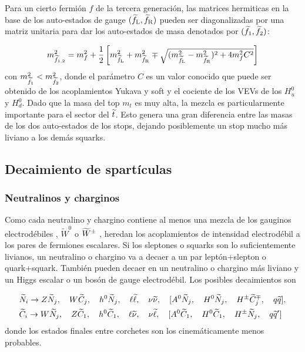 Para un cierto fermión $f$ de la tercera generación, las matrices hermiticas en
la base de los auto-estados de gauge $(\widetilde{f}_{\mathrm{L}}, \widetilde{f}_{\mathrm{R}})$ pueden ser
diagonalizadas por una matriz unitaria para dar los auto-estados de masa
denotados por $(\widetilde{f}_{\mathrm{1}}, \widetilde{f}_{\mathrm{2}})$:

\begin{equation}
  m_{\widetilde{f}_{\mathrm{1,2}}}^2 = m^2_f + \frac{1}{2} \left[
    m_{\widetilde{f}_{\mathrm{L}}}^2 + m_{\widetilde{f}_{\mathrm{R}}}^2 \mp \sqrt{(m_{\widetilde{f}_{\mathrm{L}}}^2 -
      m_{\widetilde{f}_{\mathrm{R}}}^2)^2 + 4 m_f^2 C^2} \right]
\end{equation}
%
con $m_{\widetilde{f}_{\mathrm{1}}}^2 < m_{\widetilde{f}_{\mathrm{2}}}^2$, donde el parámetro $C$ es un
valor conocido que puede ser obtenido de los acoplamientos Yukava y soft y el
cociente de los VEVs de los $H_u^0$ y $H_d^0$. Dado que la masa del top $m_t$ es
muy alta, la mezcla es particularmente importante para el sector del $\widetilde{t}$.
Esto genera una gran diferencia entre las masas de los dos auto-estados de los
stops, dejando posiblemente un stop mucho más liviano a los demás squarks.


\subsection{Decaimiento de spartículas}

\subsubsection{Neutralinos y charginos}

Como cada neutralino y chargino contiene al menos una mezcla de los gauginos
electrodébiles {\bino}, $\tilde W^0$ o $\widetilde{W}^{\pm}$ , heredan los
acoplamientos de intensidad electrodébil a los pares de fermiones escalares. Si
los sleptones o squarks son lo suficientemente livianos, un neutralino o
chargino va a decaer a un par leptón+slepton o quark+squark. También pueden
decaer en un neutralino o chargino más liviano y un Higgs escalar o un bosón
de gauge electrodébil. Los posibles decaimientos son

\begin{align*}
  &\widetilde{N}_i \rightarrow Z \widetilde{N}_j, \quad W \widetilde{C}_j, \quad h^0 \widetilde{N}_j, \quad
  \ell \widetilde{\ell}, \quad \nu \widetilde{\nu}, \quad [A^0 \widetilde{N}_j, \quad H^0
    \widetilde{N}_j, \quad H^{\pm} \widetilde{C}_j^{\mp}, \quad q \widetilde{q}],
  \\ &\widetilde{C}_i \rightarrow W \widetilde{N}_j, \quad Z \widetilde{C}_1, \quad h^0 \widetilde{C}_1,
  \quad \ell \widetilde{\nu}, \quad \nu \widetilde{\ell}, \quad [A^0 \widetilde{C}_1, \quad H^0
    \widetilde{C}_1, \quad H^{\pm} \widetilde{N}_j, \quad q \widetilde{q}']
\end{align*}
%
donde los estados finales entre corchetes son los cinemáticamente menos
probables.


